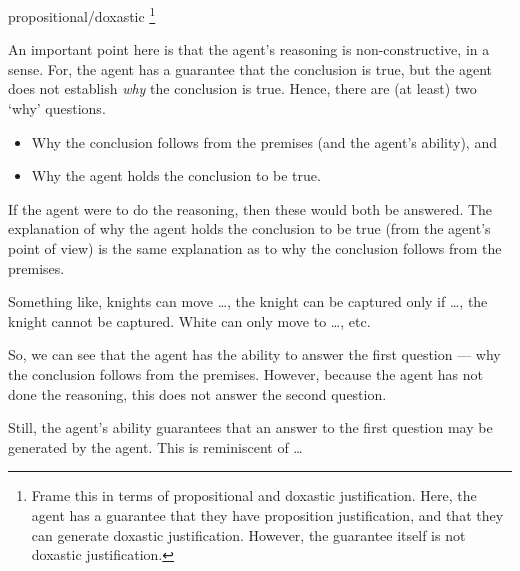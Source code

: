 \documentclass[10pt]{article}
\begin{document}
propositional/doxastic\nolinebreak
\footnote{
  Frame this in terms of propositional and doxastic justification.
  Here, the agent has a guarantee that they have proposition justification, and that they can generate doxastic justification.
  However, the guarantee itself is not doxastic justification.
}


\begin{note}[Constructive]
  An important point here is that the agent's reasoning is non-constructive, in a sense.
  For, the agent has a guarantee that the conclusion is true, but the agent does not establish \emph{why} the conclusion is true.
  Hence, there are (at least) two `why' questions.
  \begin{itemize}
  \item Why the conclusion follows from the premises (and the agent's ability), and
  \item Why the agent holds the conclusion to be true.
  \end{itemize}
  If the agent were to do the reasoning, then these would both be answered.
  The explanation of why the agent holds the conclusion to be true (from the agent's point of view) is the same explanation as to why the conclusion follows from the premises.

  Something like, knights can move \dots, the knight can be captured only if \dots, the knight cannot be captured.
  White can only move to \dots, etc.\

  So, we can see that the agent has the ability to answer the first question --- why the conclusion follows from the premises.
  However, because the agent has not done the reasoning, this does not answer the second question.

  Still, the agent's ability guarantees that an answer to the first question may be generated by the agent.
  This is reminiscent of \citeauthor{Davidson:2001aa} \dots
\end{note}
\end{document}

